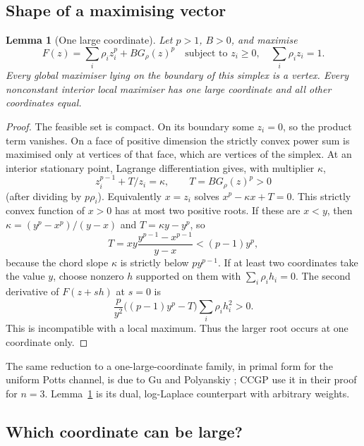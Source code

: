 \documentclass[11pt,a4paper]{article}
\numberwithin{equation}{section}
\newtheorem{lemma}[theorem]{Lemma}
\theoremstyle{definition}
\theoremstyle{remark}
\begin{document}
\subsection{Shape of a maximising vector}

\begin{lemma}[One large coordinate]\label{lem:onehigh}
Let \(p>1\), \(B>0\), and maximise
\[
F(z)=\sum_i\rho_i z_i^p+B G_\rho(z)^p
\quad\text{subject to }z_i\ge0,\quad\sum_i\rho_i z_i=1.
\]
Every global maximiser lying on the boundary of this simplex is a vertex.
Every nonconstant interior local maximiser has one large coordinate and all
other coordinates equal.
\end{lemma}
\begin{proof}
The feasible set is compact. On its boundary some \(z_i=0\), so the product
term vanishes. On a face of positive dimension the strictly convex power sum
is maximised only at vertices of that face, which are vertices of the
simplex. At an interior stationary point, Lagrange differentiation gives,
with multiplier \(\kappa\),
\[
z_i^{p-1}+T/z_i=\kappa,\qquad T=B G_\rho(z)^p>0
\]
(after dividing by \(p\rho_i\)). Equivalently \(x=z_i\) solves
\(x^p-\kappa x+T=0\). This strictly convex function of \(x>0\) has at most
two positive roots. If these are \(x<y\), then
\(\kappa=(y^p-x^p)/(y-x)\) and \(T=\kappa y-y^p\), so
\[
T=xy\frac{y^{p-1}-x^{p-1}}{y-x}<(p-1)y^p,
\]
because the chord slope \(\kappa\) is strictly below \(py^{p-1}\).
If at least two coordinates take the value \(y\), choose nonzero \(h\)
supported on them with \(\sum_i\rho_i h_i=0\). The second derivative of
\(F(z+sh)\) at \(s=0\) is
\[
\frac{p}{y^2}\big((p-1)y^p-T\big)\sum_i\rho_i h_i^2>0 .
\]
This is incompatible with a local maximum. Thus the larger root occurs at
one coordinate only.
\end{proof}

The same reduction to a one-large-coordinate family, in primal form for the
uniform Potts channel, is due to Gu and Polyanskiy
\cite[Prop.~17]{gupolyanskiy}; CCGP use it in their proof for \(n=3\).
Lemma~\ref{lem:onehigh} is its dual, log-Laplace counterpart with arbitrary
weights.

\subsection{Which coordinate can be large?}
\end{document}
